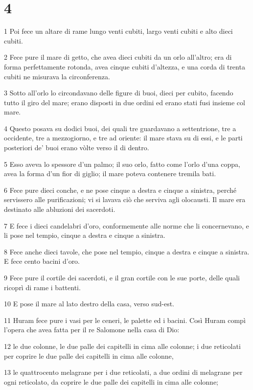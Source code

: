 \chapter{4}

\par 1 Poi fece un altare di rame lungo venti cubiti, largo venti cubiti e alto dieci cubiti.
\par 2 Fece pure il mare di getto, che avea dieci cubiti da un orlo all'altro; era di forma perfettamente rotonda, avea cinque cubiti d'altezza, e una corda di trenta cubiti ne misurava la circonferenza.
\par 3 Sotto all'orlo lo circondavano delle figure di buoi, dieci per cubito, facendo tutto il giro del mare; erano disposti in due ordini ed erano stati fusi insieme col mare.
\par 4 Questo posava su dodici buoi, dei quali tre guardavano a settentrione, tre a occidente, tre a mezzogiorno, e tre ad oriente: il mare stava su di essi, e le parti posteriori de' buoi erano vòlte verso il di dentro.
\par 5 Esso aveva lo spessore d'un palmo; il suo orlo, fatto come l'orlo d'una coppa, avea la forma d'un fior di giglio; il mare poteva contenere tremila bati.
\par 6 Fece pure dieci conche, e ne pose cinque a destra e cinque a sinistra, perché servissero alle purificazioni; vi si lavava ciò che serviva agli olocausti. Il mare era destinato alle abluzioni dei sacerdoti.
\par 7 E fece i dieci candelabri d'oro, conformemente alle norme che li concernevano, e li pose nel tempio, cinque a destra e cinque a sinistra.
\par 8 Fece anche dieci tavole, che pose nel tempio, cinque a destra e cinque a sinistra. E fece cento bacini d'oro.
\par 9 Fece pure il cortile dei sacerdoti, e il gran cortile con le sue porte, delle quali ricoprì di rame i battenti.
\par 10 E pose il mare al lato destro della casa, verso sud-est.
\par 11 Huram fece pure i vasi per le ceneri, le palette ed i bacini. Così Huram compì l'opera che avea fatta per il re Salomone nella casa di Dio:
\par 12 le due colonne, le due palle dei capitelli in cima alle colonne; i due reticolati per coprire le due palle dei capitelli in cima alle colonne,
\par 13 le quattrocento melagrane per i due reticolati, a due ordini di melagrane per ogni reticolato, da coprire le due palle dei capitelli in cima alle colonne;
